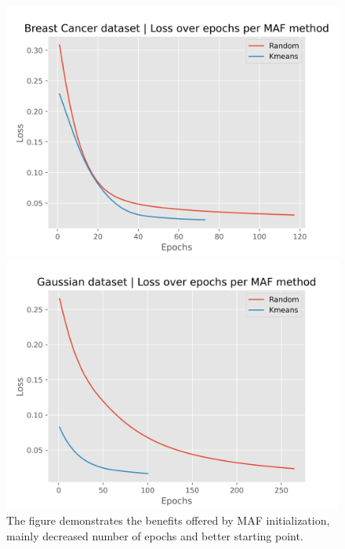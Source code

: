 \documentclass[aspectratio=169]{beamer}
\begin{document}
\begin{frame}
    \begin{figure}
    \centering
    \begin{minipage}{0.49\textwidth}
        \includegraphics[width=\linewidth]{breast-cancer-wisconsin_loss.png} %
    \end{minipage}\hfill
    \begin{minipage}{0.49\textwidth}
        \includegraphics[width=\linewidth]{gaussian_df_loss.png} %
    \end{minipage}
    \caption{The figure demonstrates the benefits offered by MAF initialization, mainly
decreased number of epochs and better starting point.}
    \label{fig:side_by_side}
\end{figure}
\end{frame}
\end{document}
